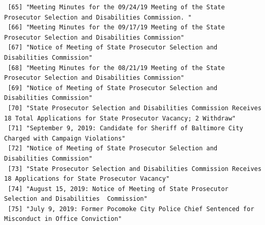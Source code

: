 \documentclass[
  letterpaper,
  DIV=11,
  numbers=noendperiod]{scrreprt}
\begin{document}
\begin{verbatim}
 [65] "Meeting Minutes for the 09/24/19 Meeting of the State Prosecutor Selection and Disabilities Commission. "                                                                                                                                            
 [66] "Meeting Minutes for the 09/17/19 Meeting of the State Prosecutor Selection and Disabilities Commission"                                                                                                                                              
 [67] "Notice of Meeting of State Prosecutor Selection and Disabilities Commission"                                                                                                                                                                         
 [68] "Meeting Minutes for the 08/21/19 Meeting of the State Prosecutor Selection and Disabilities Commission"                                                                                                                                              
 [69] "Notice of Meeting of State Prosecutor Selection and Disabilities Commission"                                                                                                                                                                         
 [70] "State Prosecutor Selection and Disabilities Commission Receives 18 Total Applications for State Prosecutor Vacancy; 2 Withdraw"                                                                                                                      
 [71] "September 9, 2019: Candidate for Sheriff of Baltimore City Charged with Campaign Violations"                                                                                                                                                         
 [72] "Notice of Meeting of State Prosecutor Selection and Disabilities Commission"                                                                                                                                                                         
 [73] "State Prosecutor Selection and Disabilities Commission Receives 18 Applications for State Prosecutor Vacancy"                                                                                                                                        
 [74] "August 15, 2019: Notice of Meeting of State Prosecutor Selection and Disabilities  Commission"                                                                                                                                                       
 [75] "July 9, 2019: Former Pocomoke City Police Chief Sentenced for Misconduct in Office Conviction"                                                                                                                                                       

\end{verbatim}
\end{document}
